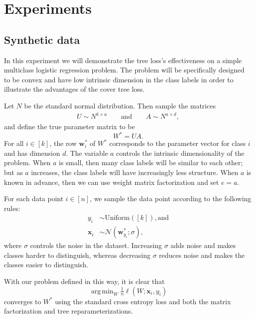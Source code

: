 \documentclass[twoside]{article}
\theoremstyle{definition}
\DeclareMathOperator*{\argmin}{arg\,min}
\newcommand{\w}{\mathbf w}
\newcommand{\x}{\mathbf x}
\newcommand{\fixme}[1]{\noindent{\color{red}\textbf{FIXME:}  {#1}}}
\begin{document}
\label{sec:bias-var}

\section{Experiments}

\subsection{Synthetic data}

In this experiment we will demonstrate the tree loss's effectiveness on a simple multiclass logistic regression problem.
The problem will be specifically designed to be convex and have low intrinsic dimension in the class labels in order to illustrate the advantages of the cover tree loss.

Let $N$ be the standard normal distribution.
Then sample the matrices
\begin{align}
    U \sim N^{k\times a} \qquad\text{and}\qquad
    A \sim N^{a\times d},
\end{align}
and define the true parameter matrix to be
\begin{equation}
    W^* = UA.
\end{equation}
For all $i \in [k]$, the row $\w_i^*$ of $W^*$ corresponds to the parameter vector for class $i$ and has dimension $d$.
The variable $a$ controls the intrinsic dimensionality of the problem.
When $a$ is small, then many class labels will be similar to each other;
but as $a$ increases, the class labels will have increasingly less structure.
When $a$ is known in advance, then we can use weight matrix factorization and set $e=a$.

For each data point $i\in[n]$,
we sample the data point according to the following rules:
\begin{align}
    y_i &\sim \text{Uniform}([k]), \text{and} \\
    \x_{i} &\sim \mathcal N(\w^*_{y_i}; \sigma),
\end{align}
where $\sigma$ controls the noise in the dataset.
Increasing $\sigma$ adds noise and makes classes harder to distinguish,
whereas decreasing $\sigma$ reduces noise and makes the classes easier to distinguish.

With our problem defined in this way, it is clear that
\begin{equation}
    \argmin_{W} \tfrac 1 n \ell(W; \x_i, y_i)
\end{equation}
converges to $W^*$ using the standard cross entropy loss and both the matrix factorization and tree reparameterizations.
\end{document}
